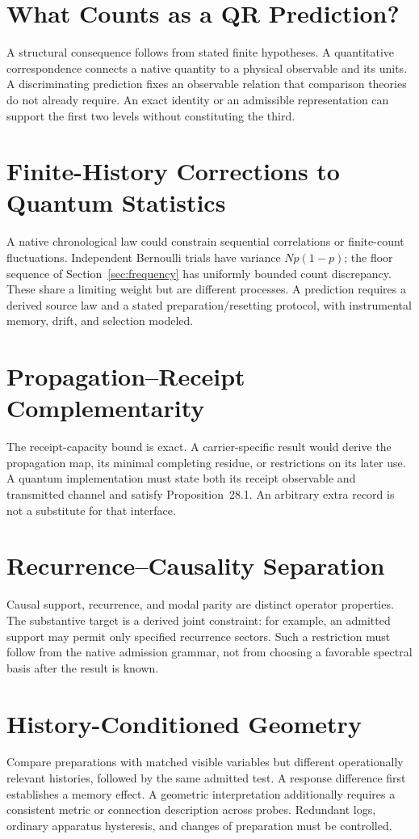 \section{What Counts as a QR Prediction?}\label{sec:predictions}
A structural consequence follows from stated finite hypotheses. A quantitative correspondence connects a native quantity to a physical observable and its units. A discriminating prediction fixes an observable relation that comparison theories do not already require. An exact identity or an admissible representation can support the first two levels without constituting the third.

\section{Finite-History Corrections to Quantum Statistics}\label{sec:finitecorrections}
A native chronological law could constrain sequential correlations or finite-count fluctuations. Independent Bernoulli trials have variance $Np(1-p)$; the floor sequence of Section~\ref{sec:frequency} has uniformly bounded count discrepancy. These share a limiting weight but are different processes. A prediction requires a derived source law and a stated preparation/resetting protocol, with instrumental memory, drift, and selection modeled.

\section{Propagation--Receipt Complementarity}\label{sec:receiptprediction}
The receipt-capacity bound is exact. A carrier-specific result would derive the propagation map, its minimal completing residue, or restrictions on its later use. A quantum implementation must state both its receipt observable and transmitted channel and satisfy Proposition~28.1. An arbitrary extra record is not a substitute for that interface.

\section{Recurrence--Causality Separation}\label{sec:recurrenceprediction}
Causal support, recurrence, and modal parity are distinct operator properties. The substantive target is a derived joint constraint: for example, an admitted support may permit only specified recurrence sectors. Such a restriction must follow from the native admission grammar, not from choosing a favorable spectral basis after the result is known.

\section{History-Conditioned Geometry}\label{sec:geometryprediction}
Compare preparations with matched visible variables but different operationally relevant histories, followed by the same admitted test. A response difference first establishes a memory effect. A geometric interpretation additionally requires a consistent metric or connection description across probes. Redundant logs, ordinary apparatus hysteresis, and changes of preparation must be controlled.
